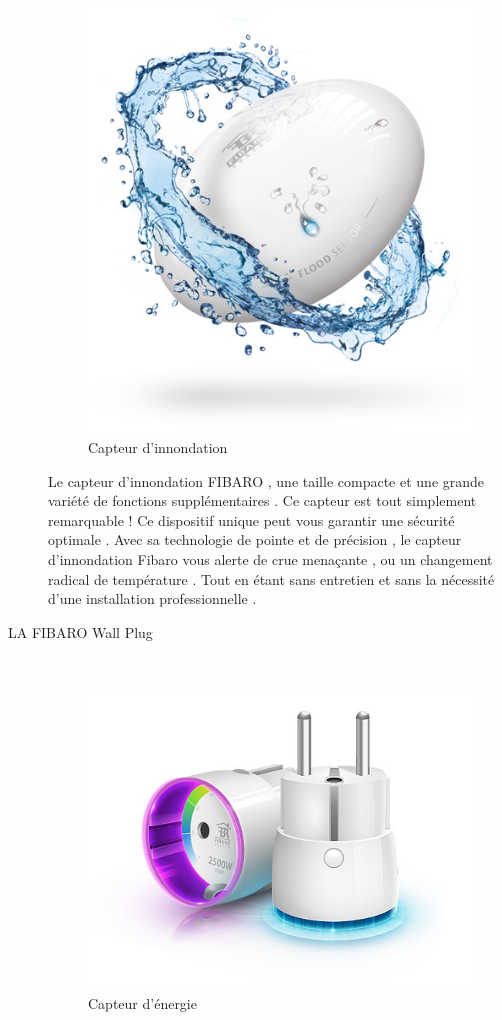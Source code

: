 \begin{description}
\begin{figure}[h]
	\center
	\includegraphics[scale=0.5]{./Images/jpg/floodSensor_FibaroDevice.jpg}
	\caption{Capteur d'innondation}
\end{figure}

Le capteur d'innondation FIBARO , une taille compacte et une grande variété de fonctions supplémentaires . Ce capteur est tout simplement remarquable ! Ce dispositif unique peut vous garantir une sécurité optimale . Avec sa technologie de pointe et de précision , le capteur d'innondation Fibaro vous alerte de crue menaçante , ou un changement radical de température . Tout en étant sans entretien et sans la nécessité d'une installation professionnelle .


\item[LA FIBARO Wall Plug] \hfill \\
\begin{figure}[h]
	\center
	\includegraphics[scale=0.5]{./Images/jpg/WallPlug_FibaroDevice.jpg}
	\caption{Capteur d'énergie}
\end{figure}


\end{description}
